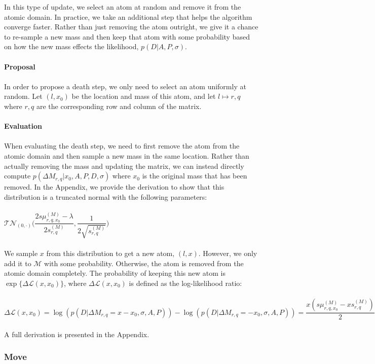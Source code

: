 \documentclass[]{article}
\begin{document}
In this type of update, we select an atom at random and remove it from the atomic domain. In practice, we take an additional step that helps the algorithm converge faster. Rather than just removing the atom outright, we give it a chance to re-sample a new mass and then keep that atom with some probability based on how the new mass effects the likelihood, $p(D | A, P, \sigma)$.\\
\\
\textbf{Proposal}\\
\\
In order to propose a death step, we only need to select an atom uniformly at random. Let $(l,x_0)$ be the location and mass of this atom, and let $l \mapsto r,q$ where $r,q$ are the corresponding row and column of the matrix.\\
\\
\textbf{Evaluation}\\
\\
When evaluating the death step, we need to first remove the atom from the atomic domain and then sample a new mass in the same location. Rather than actually removing the mass and updating the matrix, we can instead directly compute $p(\Delta M_{r,q} |x_0, A, P, D, \sigma)$ where $x_0$ is the original mass that has been removed. In the Appendix, we provide the derivation to show that this distribution is a truncated normal with the following parameters:\\
\\
$\mathcal{TN}_{(0,\cdot)}\biggr(\dfrac{2 s\mu_{r,q,x_0}^{(M)} - \lambda}{2s_{r,q}^{(M)}}, \dfrac{1}{2\sqrt{s_{r,q}^{(M)}}}\biggr)$\\
\\
We sample $x$ from this distribution to get a new atom, $(l,x)$. However, we only add it to $\mathcal{M}$ with some probability. Otherwise, the atom is removed from the atomic domain completely. The probability of keeping this new atom is $\exp\{\Delta\mathcal{L}(x, x_0)\}$, where $\Delta\mathcal{L}(x, x_0)$ is defined as the log-likelihood ratio:\\
\\
$\Delta\mathcal{L}(x, x_0) = \log(p(D|\Delta M_{r,q} = x - x_0,\sigma,A,P)) - \log(p(D|\Delta M_{r,q} = -x_0,\sigma,A,P)) = \dfrac{x(s\mu_{r,q,x_0}^{(M)} - xs_{r,q}^{(M)})}{2}$\\
\\
A full derivation is presented in the Appendix.

\subsubsection{Move}
\end{document}
